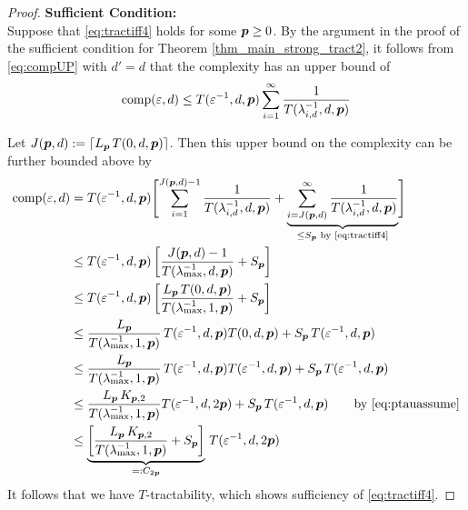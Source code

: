 \documentclass[11pt,a4paper]{article}
\begin{document}
\begin{proof}
    \textbf{Sufficient Condition:}\\
Suppose that \eqref{eq:tractiff4} holds for some $\boldsymbol{p} \ge 0$. By the argument in the proof of the sufficient condition for Theorem \ref{thm_main_strong_tract2}, it follows from \eqref{eq:compUP} with $d'=d$ that the complexity has an upper bound of
\begin{equation*}
	 \operatorname{comp}(\varepsilon,d) \le  T(\varepsilon^{-1},d,\boldsymbol{p}) \sum_{i=1}^\infty \frac{1}{T(\lambda_{i, d}^{-1},d,\boldsymbol{p})}
\end{equation*}

Let $J(\boldsymbol{p},d): = \lceil L_{\boldsymbol{p}}\, T(0,d,\boldsymbol{p})\rceil$.  Then this upper bound on the complexity can be further bounded above by
\begin{align*}
       \operatorname{comp}(\varepsilon,d)
       & = T(\varepsilon^{-1},d,\boldsymbol{p}) \Biggl [ \sum_{i=1}^{J(\boldsymbol{p},d) -1} \frac{1}{T(\lambda_{i, d}^{-1},d,\boldsymbol{p})}
       + \underbrace{\sum_{i=J(\boldsymbol{p},d)}^\infty \frac{1}{T(\lambda_{i, d}^{-1},d,\boldsymbol{p})}}_{\le S_{\boldsymbol{p}} \text{ by \eqref{eq:tractiff4}}} \Biggr ] \\
       & \le T(\varepsilon^{-1},d,\boldsymbol{p})\left[ \frac{J(\boldsymbol{p},d)-1}{T(\lambda_{\max}^{-1},d,\boldsymbol{p})} + S_{\boldsymbol{p}}\right]
        \\
       & \le T(\varepsilon^{-1},d,\boldsymbol{p})\left[\frac{L_{\boldsymbol{p}}\, T(0,d,\boldsymbol{p})}{T(\lambda_{\max}^{-1},1,\boldsymbol{p})} + S_{\boldsymbol{p}}\right] \\
       & \le\frac{L_{\boldsymbol{p}}}{T(\lambda_{\max}^{-1},1,\boldsymbol{p})} \,T(\varepsilon^{-1},d,\boldsymbol{p}) T(0,d,\boldsymbol{p}) + S_{\boldsymbol{p}}\, T(\varepsilon^{-1},d,\boldsymbol{p})\\
       & \le\frac{L_{\boldsymbol{p}}}{T(\lambda_{\max}^{-1},1,\boldsymbol{p})} \,T(\varepsilon^{-1},d,\boldsymbol{p}) T(\varepsilon^{-1},d,\boldsymbol{p}) + S_{\boldsymbol{p}}\, T(\varepsilon^{-1},d,\boldsymbol{p})\\
       & \le \frac{L_{\boldsymbol{p}}\,K_{\boldsymbol{p},2}}{T(\lambda_{\max}^{-1},1,\boldsymbol{p})}  T(\varepsilon^{-1},d,2\boldsymbol{p})  + S_{\boldsymbol{p}}\, T(\varepsilon^{-1},d,\boldsymbol{p})  \qquad \text{by \eqref{eq:ptauassume}}\\
       & \le \underbrace{\left[\frac{L_{\boldsymbol{p}}\,K_{\boldsymbol{p},2}}{T(\lambda_{\max}^{-1},1,\boldsymbol{p})} + S_{\boldsymbol{p}}\right]}_{=:C_{2\boldsymbol{p}}} \,T(\varepsilon^{-1},d,2\boldsymbol{p})
\end{align*}
It follows that we have $T$-tractability, which shows sufficiency of \eqref{eq:tractiff4}.

\bigskip


\end{proof}
\end{document}
